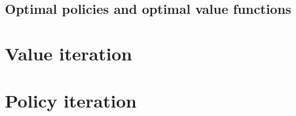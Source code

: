 \documentclass[a4paper]{article}
\begin{document}
\subsection{Optimal policies and optimal value functions}

\section{Value iteration}

\section{Policy iteration}
\end{document}
